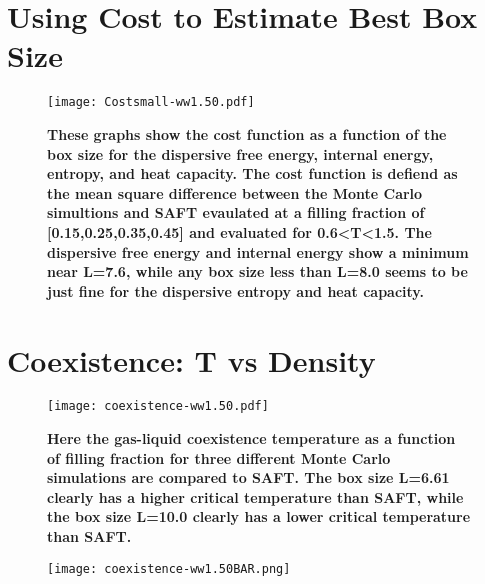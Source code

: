 \pagebreak
\section{Using Cost to Estimate Best Box Size}
\begin{figure}[h]
\vspace*{-10mm}
\hspace*{-6mm}
	\centering
	\texttt{[image: Costsmall-ww1.50.pdf]}
	\caption{\scriptsize\textbf{
	These graphs show the cost function as a function of the box size for the dispersive free energy, internal energy, entropy, and heat capacity. The cost function is defiend as the mean square difference between the Monte Carlo simultions and SAFT evaulated at a filling fraction of [0.15,0.25,0.35,0.45] and evaluated for 0.6\textless T\textless 1.5. The dispersive free energy and internal energy show a minimum near L=7.6, while any box size less than L=8.0 seems to be just fine for the dispersive entropy and heat capacity.}}
	\label{fig:Cost}
\end{figure}
\section{Coexistence: T vs Density}
\begin{figure}[h]
\vspace*{-10mm}
\hspace*{-6mm}
	\centering
	\texttt{[image: coexistence-ww1.50.pdf]}
	\caption{\scriptsize\textbf{
	Here the gas-liquid coexistence temperature as a function of filling fraction for three different Monte Carlo simulations are compared to SAFT. The box size L=6.61 clearly has a higher critical temperature than SAFT, while the box size L=10.0 clearly has a lower critical temperature than SAFT.}}
	\label{fig:Coexistence}
\end{figure}

\begin{figure}[h!]
\vspace*{-64.5mm}
\hspace*{-110mm}
	\centering
	\texttt{[image: coexistence-ww1.50BAR.png]}
\end{figure}




